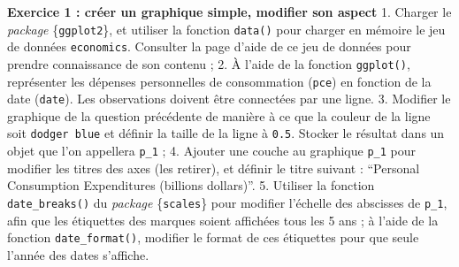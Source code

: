 \documentclass[
  11pt,
]{book}
\makeatletter
\numberwithin{equation}{section}
\numberwithin{countremarque}{section}
\newenvironment{exframe}{%
 \def\at@end@of@exframe{}%
 \ifinner\ifhmode%
  \def\at@end@of@exframe{\end{minipage}}%
  \begin{minipage}{\columnwidth}%
 \fi\fi%
 \def\FrameCommand##1{\hskip\@totalleftmargin \hskip-\fboxsep
 \colorbox{shadecolorex}{##1}\hskip-\fboxsep
     \hskip-\linewidth \hskip-\@totalleftmargin \hskip\columnwidth}%
 \MakeFramed {\advance\hsize-\width
   \@totalleftmargin\z@ \linewidth\hsize
   \@setminipage}}%
 {\par\unskip\endMakeFramed%
 \at@end@of@exframe}
\makeatother
\begin{document}
\begin{exframe}
\textbf{Exercice 1 : créer un graphique simple, modifier son aspect}
1. Charger le \emph{package} \{\texttt{ggplot2}\}, et utiliser la fonction \texttt{data()} pour charger en mémoire le jeu de données \texttt{economics}. Consulter la page d'aide de ce jeu de données pour prendre connaissance de son contenu ;
2. À l'aide de la fonction \texttt{ggplot()}, représenter les dépenses personnelles de consommation (\texttt{pce}) en fonction de la date (\texttt{date}). Les observations doivent être connectées par une ligne.
3. Modifier le graphique de la question précédente de manière à ce que la couleur de la ligne soit \texttt{dodger\ blue} et définir la taille de la ligne à \texttt{0.5}. Stocker le résultat dans un objet que l'on appellera \texttt{p\_1} ;
4. Ajouter une couche au graphique \texttt{p\_1} pour modifier les titres des axes (les retirer), et définir le titre suivant : ``Personal Consumption Expenditures (billions dollars)''.
5. Utiliser la fonction \texttt{date\_breaks()} du \emph{package} \{\texttt{scales}\} pour modifier l'échelle des abscisses de \texttt{p\_1}, afin que les étiquettes des marques soient affichées tous les 5 ans ; à l'aide de la fonction \texttt{date\_format()}, modifier le format de ces étiquettes pour que seule l'année des dates s'affiche.
\end{exframe}
\end{document}
